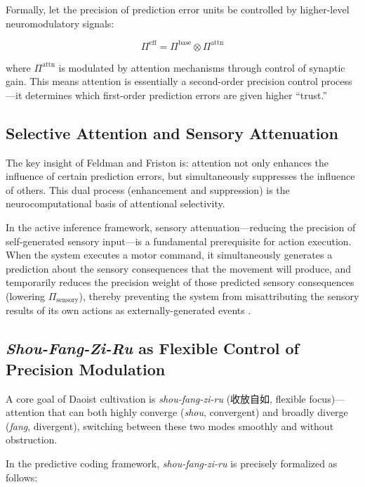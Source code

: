 \documentclass[11pt,a4paper]{article}
\begin{document}
Formally, let the precision of prediction error units be controlled by higher-level neuromodulatory signals:

\begin{equation}
\Pi^{\text{eff}} = \Pi^{\text{base}} \otimes \Pi^{\text{attn}}
\label{eq:attn_precision}
\end{equation}

where $\Pi^{\text{attn}}$ is modulated by attention mechanisms through control of synaptic gain. This means attention is essentially a second-order precision control process---it determines which first-order prediction errors are given higher ``trust.''

\subsection{Selective Attention and Sensory Attenuation}

The key insight of Feldman and Friston \cite{Feldman2010} is: attention not only enhances the influence of certain prediction errors, but simultaneously suppresses the influence of others. This dual process (enhancement and suppression) is the neurocomputational basis of attentional selectivity.

In the active inference framework, sensory attenuation---reducing the precision of self-generated sensory input---is a fundamental prerequisite for action execution. When the system executes a motor command, it simultaneously generates a prediction about the sensory consequences that the movement will produce, and temporarily reduces the precision weight of those predicted sensory consequences (lowering $\Pi_{\text{sensory}}$), thereby preventing the system from misattributing the sensory results of its own actions as externally-generated events \cite{Brown2013}.

\subsection{\textit{Shou-Fang-Zi-Ru} as Flexible Control of Precision Modulation}

A core goal of Daoist cultivation is \textit{shou-fang-zi-ru} (收放自如, flexible focus)---attention that can both highly converge (\textit{shou}, convergent) and broadly diverge (\textit{fang}, divergent), switching between these two modes smoothly and without obstruction.

In the predictive coding framework, \textit{shou-fang-zi-ru} is precisely formalized as follows:
\end{document}
